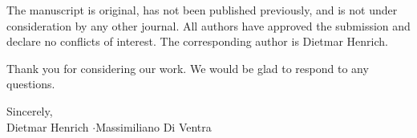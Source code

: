 \documentclass[11pt]{article}
\begin{document}
The manuscript is original, has not been published previously, and is not under
consideration by any other journal. All authors have approved the submission and
declare no conflicts of interest. The corresponding author is Dietmar Henrich.

Thank you for considering our work. We would be glad to respond to any questions.

\vspace{0.8em}
\noindent Sincerely,\\[0.4em]
Dietmar Henrich \quad$\cdot$\quad Massimiliano Di Ventra
\end{document}
